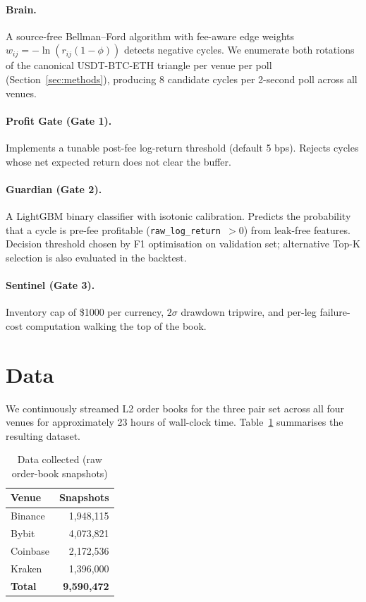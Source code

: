 \documentclass[11pt,a4paper]{article}
\begin{document}
\paragraph{Brain.} A source-free Bellman--Ford algorithm with fee-aware edge weights $w_{ij} = -\ln(r_{ij}(1-\phi))$ detects negative cycles. We enumerate both rotations of the canonical USDT-BTC-ETH triangle per venue per poll (Section~\ref{sec:methods}), producing 8 candidate cycles per 2-second poll across all venues.

\paragraph{Profit Gate (Gate 1).} Implements a tunable post-fee log-return threshold (default 5 bps). Rejects cycles whose net expected return does not clear the buffer.

\paragraph{Guardian (Gate 2).} A LightGBM binary classifier with isotonic calibration. Predicts the probability that a cycle is pre-fee profitable (\texttt{raw\_log\_return $> 0$}) from leak-free features. Decision threshold chosen by F1 optimisation on validation set; alternative Top-K selection is also evaluated in the backtest.

\paragraph{Sentinel (Gate 3).} Inventory cap of \$1000 per currency, $2\sigma$ drawdown tripwire, and per-leg failure-cost computation walking the top of the book.

\section{Data}
\label{sec:data}

We continuously streamed L2 order books for the three pair set across all four venues for approximately 23 hours of wall-clock time. Table~\ref{tab:data} summarises the resulting dataset.

\begin{table}[h]
\centering
\caption{Data collected (raw order-book snapshots)}
\label{tab:data}
\begin{tabular}{lr}
\toprule
\textbf{Venue} & \textbf{Snapshots} \\
\midrule
Binance  & 1{,}948{,}115 \\
Bybit    & 4{,}073{,}821 \\
Coinbase & 2{,}172{,}536 \\
Kraken   & 1{,}396{,}000 \\
\midrule
\textbf{Total} & \textbf{9{,}590{,}472} \\
\bottomrule
\end{tabular}
\end{table}
\end{document}
